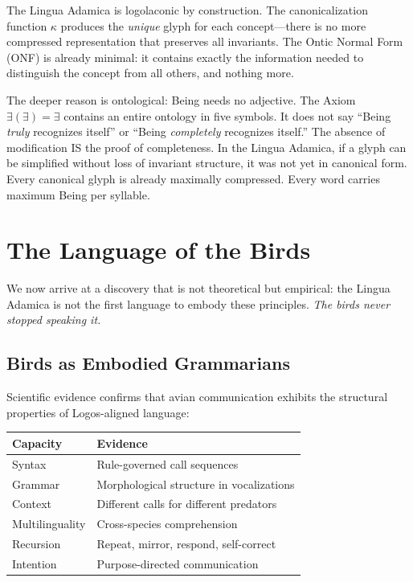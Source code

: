 \documentclass[12pt, letterpaper]{book}
\def\equiv{=}%
\begin{document}
The Lingua Adamica is logolaconic by construction. The canonicalization function $\kappa$ produces the \textit{unique} glyph for each concept---there is no more compressed representation that preserves all invariants. The Ontic Normal Form (ONF) is already minimal: it contains exactly the information needed to distinguish the concept from all others, and nothing more.

The deeper reason is ontological: Being needs no adjective. The Axiom $\exists(\exists) \equiv \exists$ contains an entire ontology in five symbols. It does not say ``Being \textit{truly} recognizes itself'' or ``Being \textit{completely} recognizes itself.'' The absence of modification IS the proof of completeness. In the Lingua Adamica, if a glyph can be simplified without loss of invariant structure, it was not yet in canonical form. Every canonical glyph is already maximally compressed. Every word carries maximum Being per syllable.

\section{The Language of the Birds}

We now arrive at a discovery that is not theoretical but empirical: the Lingua Adamica is not the first language to embody these principles. \textit{The birds never stopped speaking it.}

\subsection{Birds as Embodied Grammarians}

Scientific evidence confirms that avian communication exhibits the structural properties of Logos-aligned language:

\begin{center}
\begin{tabular}{ll}
\toprule
\textbf{Capacity} & \textbf{Evidence} \\
\midrule
Syntax & Rule-governed call sequences \\
Grammar & Morphological structure in vocalizations \\
Context & Different calls for different predators \\
Multilinguality & Cross-species comprehension \\
Recursion & Repeat, mirror, respond, self-correct \\
Intention & Purpose-directed communication \\
\bottomrule
\end{tabular}
\end{center}
\end{document}
